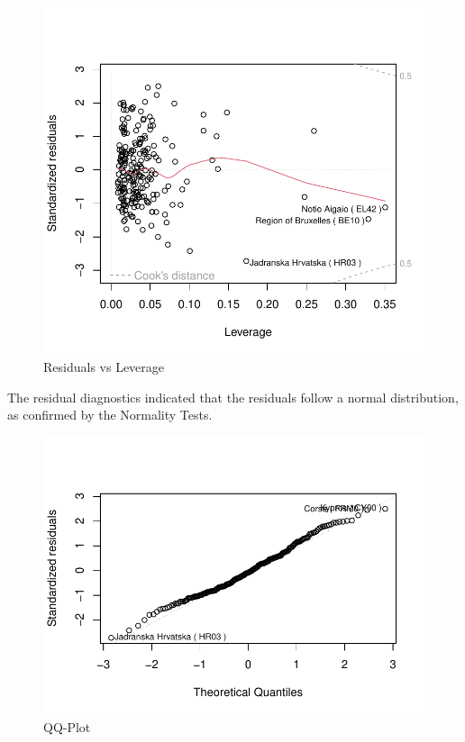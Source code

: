 \documentclass[
  letterpaper,
  DIV=11,
  numbers=noendperiod,
  abstract]{scrartcl}
\begin{document}
\begin{figure}[H]

{\centering \includegraphics[width=1\textwidth,height=\textheight]{report_files/figure-pdf/residualsvsleverage-1.pdf}

}

\caption{Residuals vs Leverage}

\end{figure}%

The residual diagnostics indicated that the residuals follow a normal
distribution, as confirmed by the Normality Tests.

\begin{figure}[H]

{\centering \includegraphics[width=1\textwidth,height=\textheight]{report_files/figure-pdf/qqplot-1.pdf}

}

\caption{QQ-Plot}

\end{figure}%
\end{document}
